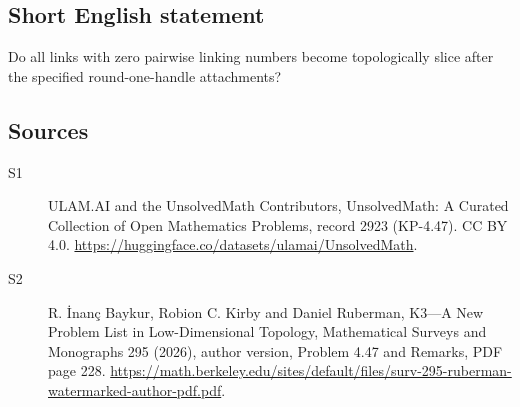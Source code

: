 \documentclass[11pt]{article}
\begin{document}
\subsection{Short English statement}
Do all links with zero pairwise linking numbers become topologically slice after the specified round-one-handle attachments?
\subsection{Sources}
\begin{description}
\item[\hypertarget{source:2923:1}{S1}] ULAM.AI and the UnsolvedMath Contributors, UnsolvedMath: A Curated Collection of Open Mathematics Problems, record 2923 (KP-4.47). CC BY 4.0. \url{https://huggingface.co/datasets/ulamai/UnsolvedMath}.
\item[\hypertarget{source:2923:2}{S2}] R. İnanç Baykur, Robion C. Kirby and Daniel Ruberman, K3—A New Problem List in Low-Dimensional Topology, Mathematical Surveys and Monographs 295 (2026), author version, Problem 4.47 and Remarks, PDF page 228. \url{https://math.berkeley.edu/sites/default/files/surv-295-ruberman-watermarked-author-pdf.pdf}.
\end{description}
\label{end:2923}
\end{document}
